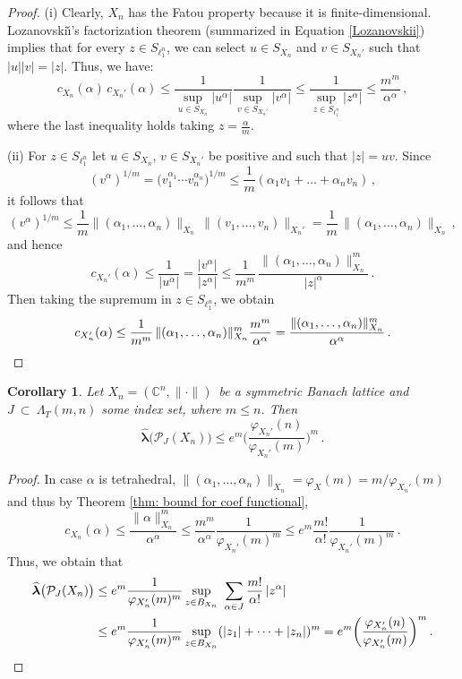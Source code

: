 \documentclass[12pt]{amsart}
\numberwithin{subsection}{section}
\newtheorem{corollary}[theorem]{Corollary}
\theoremstyle{definition}
\theoremstyle{remark}
\newcommand{\dis}{\displaystyle}
\begin{document}
\begin{proof}
(i)
Clearly, \(X_n\) has the Fatou property because it is finite-dimensional. Lozanovski\v{\i}'s factorization theorem (summarized
in Equation \eqref{Lozanovskii}) implies that for every \(z \in S_{\ell_1^n}\), we can select \(u \in S_{X_n}\) and \(v \in S_{X_{n}'}\)
such that \(|u||v| = |z|\). Thus,  we have:
\[
c_{X_n}(\alpha)\,c_{X_{n}'}(\alpha) \le \frac{1}{\dis\sup_{u \in S_{X_n}}|u^\alpha|} \frac{1}{\dis\sup_{v \in S_{X_n'}}|v^\alpha|}
\le \frac{1}{\dis\sup_{z\in S_{\ell_1^n}}|z^\alpha|} \le \frac{m^m}{\alpha^\alpha}\,,
\]
where the last inequality holds taking $z= \frac{\alpha}{m}$.

(ii) For  $z \in S_{\ell_1^n}$ let  $u\in S_{X_n}$, $v\in S_{X_n'}$ be positive and such that $|z|=uv$. Since
\[
(v^{\alpha})^{1/m}= \big(v_1^{\alpha_1} \cdots v_n^{\alpha_n}\big)^{1/m}
\leq \frac{1}{m}(\alpha_1 v_1 + \ldots + \alpha_n v_n)\,,
\]
it follows that
\[
(v^{\alpha})^{1/m} \leq \frac{1}{m} \|(\alpha_1, \ldots, \alpha_n)\|_{X_n}\,\|(v_1, \ldots, v_n)\|_{X_{n}'}
= \frac{1}{m}\,\|(\alpha_1, \ldots, \alpha_n)\|_{X_n}\,,
\]
and hence
\[
c_{X_{n}'}(\alpha) \le \frac{1}{|u^\alpha|} =  \frac{|v^\alpha|}{|z^\alpha|}
\le \frac{1}{m^m}\,\frac{\|(\alpha_1, \ldots, \alpha_n)\|^m_{X_n}}{|z|^{\alpha}}\,.
\]
Then taking the supremum in $z \in S_{\ell_1^n}$, we obtain
\[
c_{X_{n}'}(\alpha) \le \frac{1}{m^m}\,\|(\alpha_1, \ldots, \alpha_n)\|^m_{X_n}\frac{m^m}{\alpha^\alpha}
= \frac{\|(\alpha_1, \ldots, \alpha_n)\|^m_{X_n}}{\alpha^\alpha}\,. \qedhere
\]
\end{proof}

\smallskip

\begin{corollary}\label{coro: bound proj constant tetra}
\label{lambda}
Let $X_n= (\mathbb{C}^n, \|\cdot\|)$~be a symmetric Banach lattice and  $J~\subset~\Lambda_T(m,n)$ some index set, where
$m \leq n$. Then
\[
\widehat{\boldsymbol{\lambda}}\big(\mathcal{P}_J(X_n)\big)
\le e^{m} \bigg(\frac{\varphi_{X_{n}'}(n)}{\varphi_{X_{n}'}(m)}\bigg)^{m}\,.
\]
\end{corollary}

\begin{proof}
In case $\alpha$ is tetrahedral, $\|(\alpha_1, \ldots, \alpha_n)\|_{X_n}=\varphi_X(m) = m/\varphi_{X_{n}'}(m)$ and
thus by Theorem \ref{thm: bound for coef functional},
\[
c_{X_n}(\alpha) \le \frac{\|\alpha\|^m_{X_n}}{\alpha^\alpha} \le
\frac{m^m}{\alpha^\alpha}\frac1{\varphi_{X_{n}'}(m)^m}\le e^m\frac{m!}{\alpha!}\frac1{\varphi_{X_{n}'}(m)^m}\,.
\]
Thus, we obtain that
\begin{align*}
\widehat{\boldsymbol{\lambda}}\big(\mathcal{P}_{J}(X_n)\big)
& \leq e^m\frac1{\varphi_{X_{n}'}(m)^m}\sup_{z\in B_{X_n}}\,\,\sum_{\alpha \in J}  \frac{m!}{\alpha!} \,|z^\alpha | \\
& \le e^m\frac1{\varphi_{X_{n}'}(m)^m}\sup_{z\in B_{X_n}}(|z_1|+\dots+|z_n|)^m
= e^m \bigg(\frac{\varphi_{X_{n}'}(n)}{\varphi_{X_{n}'}(m)}\bigg)^{m}\,. \qedhere
\end{align*}
\end{proof}
\end{document}
